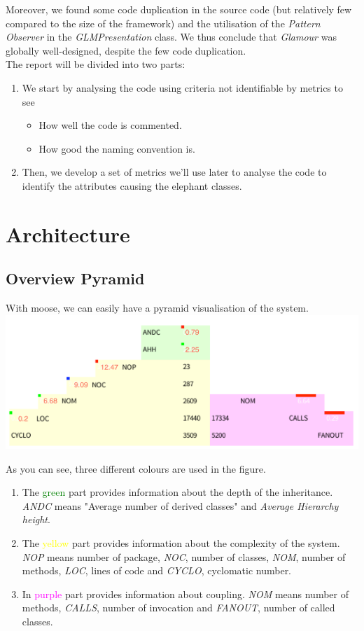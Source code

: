 \documentclass[11pt,a4paper]{article}
\begin{document}
Moreover, we found some code duplication in the source code (but relatively few compared to the size of the framework) and the utilisation  of the \textit{Pattern Observer} in the \textit{GLMPresentation} class. We thus conclude that \textit{Glamour} was globally well-designed, despite the few code duplication.\\

The report will be divided into two parts:\\
\begin{enumerate}
	\item We start by analysing the code using criteria not identifiable by metrics to see
		\begin{itemize}
		\item How well the code is commented.
		\item How good the naming convention is.
		\end{itemize}
	\item Then, we develop a set of metrics we'll use later to analyse the code to identify the attributes causing the elephant classes.
\end{enumerate}
\newpage

\section{Architecture}
\subsection{Overview Pyramid}
With moose, we can easily have a pyramid visualisation of the system.\\
\includegraphics[width=\textwidth]{pyramid}

As you can see, three different colours are used in the figure.
\begin{enumerate}
\item The \textcolor{green}{green} part provides information about the depth of the inheritance. \textit{ANDC} means "Average number of derived classes" and \textit{Average Hierarchy height}.  
\item The \textcolor{yellow}{yellow} part provides information about the complexity of the system. \textit{NOP} means number of package, \textit{NOC}, number of classes, \textit{NOM}, number of methods, \textit{LOC}, lines of code and \textit{CYCLO}, cyclomatic number.
\item In \textcolor{magenta}{purple} part provides information about coupling. \textit{NOM} means number of methods, \textit{CALLS}, number of invocation and \textit{FANOUT}, number of called classes.
\end{enumerate}
\end{document}
